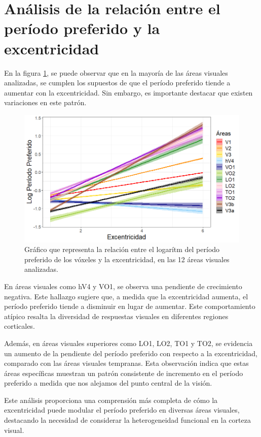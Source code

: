 \section{Análisis de la relación entre el período preferido y la excentricidad}

En la figura \ref{fig:pp_vs_eccen}, se puede observar que en la mayoría de las áreas visuales analizadas, se cumplen los supuestos de que el período preferido tiende a aumentar con la excentricidad. Sin embargo, es importante destacar que existen variaciones en este patrón.

\begin{figure}[h]
	\centering
	\includegraphics[scale=0.6]{Graphics/pp_vs_eccen}
	\caption{Gráfico que representa la relación entre el logar\'itm del per\'iodo preferido de los v\'oxeles y la excentricidad, en las 12 áreas visuales analizadas.}
	\label{fig:pp_vs_eccen}
\end{figure}

En áreas visuales como hV4 y VO1, se observa una pendiente de crecimiento negativa. Este hallazgo sugiere que, a medida que la excentricidad aumenta, el período preferido tiende a disminuir en lugar de aumentar. Este comportamiento atípico resalta la diversidad de respuestas visuales en diferentes regiones corticales.

Además, en áreas visuales superiores como LO1, LO2, TO1 y TO2,  se evidencia un aumento de la pendiente del período preferido con respecto a la excentricidad, comparado con las áreas visuales tempranas. Esta observación indica que estas áreas específicas muestran un patrón consistente de incremento en el período preferido a medida que nos alejamos del punto central de la visión.

Este análisis proporciona una comprensión más completa de cómo la excentricidad puede modular el período preferido en diversas áreas visuales, destacando la necesidad de considerar la heterogeneidad funcional en la corteza visual.


